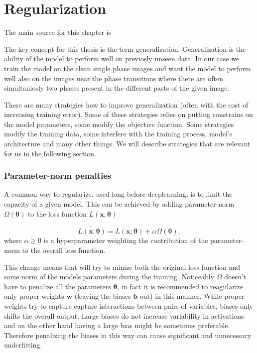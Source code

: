 
\chapter{Regularization}


The main source for this chapter is \cite{bengio2017deep}

The key concept for this thesis is the term generalization. Generalization is the ability of the model to perform well on previosly unseen data. In our case we train the model on the clean single phase images and want the model to perform well also on the images near the phase transitions where there are often simultaniosly two phases present in the different parts of the given image. 

There are many strategies how to improve generalization (often with the cost of increasing training error). Some of these strategies relies on putting constrains on the model parameters, some modify the objective function. Some strategies modify the training data, some interfere with the training process, model's architecture and many other things. We will describe strategies that are relevant for us in the following section.

\subsection{Parameter-norm penalties}
A common way to regularize, used long before deeplearning, is to limit the capacity of a given model. This can be achieved by adding parameter-norm $\Omega(\bm{\theta})$ to the loss function $L(\bm{x}; \bm{\theta})$

\begin{equation}
	\label{eq:loss-parameter-norm}
	\tilde{L(\bm{x}; \bm{\theta})} = L(\bm{x}; \bm{\theta}) + \alpha \Omega(\bm{\theta}),
\end{equation}
where $\alpha \geq 0$ is a hyperparameter weighting the contribution of the parameter-norm to the overall loss function.

This change means that will try to minize both the original loss function and some norm of the models parameters during the training. Noticeably $\Omega$ doesn't have to penalize all the parameters $\bm{\theta}$, in fact it is recommended to reagularize only proper weights $\bm{w}$ (leaving the biases $\bm{b}$ out) in this manner. While proper weights try to capture capture interactions between pairs of variables, biases only shifts the overall output. Large biases do not increase variability in activations and on the other hand having a large bias might be sometimes preferable. Therefore penalizing the biases in this way can cause significant and unnecessary underfitting.


